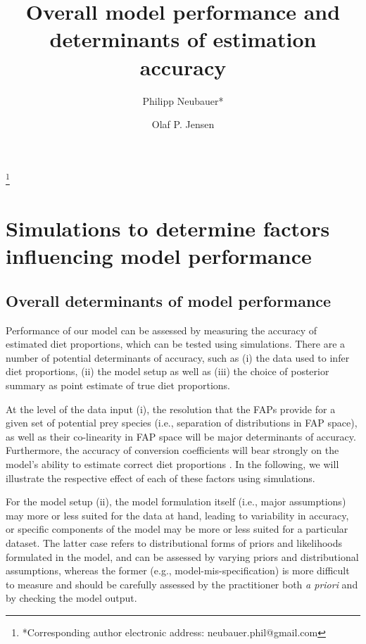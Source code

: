 \documentclass[12pt]{article}
\begin{document}
\title{Overall model performance and determinants of estimation accuracy}

\renewcommand\footnotemark{}

\author{Philipp Neubauer*}\thanks{*Corresponding author electronic address: neubauer.phil@gmail.com}%
%

\author{Olaf P. Jensen}%
%

\maketitle

\section{Simulations to determine factors influencing model performance} 

\subsection{Overall determinants of model performance}

Performance of our model can be assessed by measuring the accuracy of estimated
diet proportions, which can be tested using simulations. There are a
number of potential determinants of accuracy, such as (i) the data used to infer diet
proportions, (ii) the
model setup as well as (iii) the choice of posterior summary as point
estimate of true diet proportions.

At the level of the data input (i), the resolution that the FAPs
provide for a given set of potential prey species (i.e., separation of
distributions in FAP space), as well as their
co-linearity in FAP space will be major determinants of
accuracy. Furthermore, the accuracy of conversion coefficients will
bear strongly on the model's ability to
estimate correct diet proportions
\citep{iverson_quantitative_2004}. In the following, we will
illustrate the respective effect of each of these factors using simulations.

For the model setup (ii), the model formulation itself (i.e., major assumptions) may more or
less suited for the data at hand, leading
to variability in accuracy, or specific components of the model may be
more or less suited for a particular dataset. The latter case refers
to distributional forms of priors and likelihoods formulated
in the model, and can be assessed by varying priors and distributional
assumptions, whereas the former (e.g., model-mis-specification) is more
difficult to measure and should be carefully assessed by the
practitioner both \emph{a priori} and by checking the model output.
 
\end{document}

